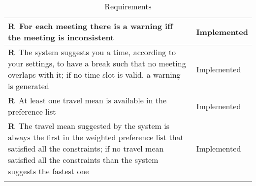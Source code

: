 \begin{longtable}{|m{7cm}|m{7cm}|}
	\textbf{R\reqNum}~For each meeting there is a warning iff the meeting is inconsistent & Implemented \\ \hline
	\textbf{R\reqNum}~The system suggests you a time, according to your settings, to have a break such that no meeting overlaps with it; if no time slot is valid, a warning is generated & Implemented \\ \hline
	\textbf{R\reqNum}~At least one travel mean is available in the preference list & Implemented \\ \hline
	\textbf{R\reqNum}~The travel mean suggested by the system is always the first in the weighted preference list that satisfied all the constraints; if no travel mean satisfied all the constraints than the system suggests the fastest one & Implemented \\ \hline
	\caption{Requirements}
\end{longtable}
